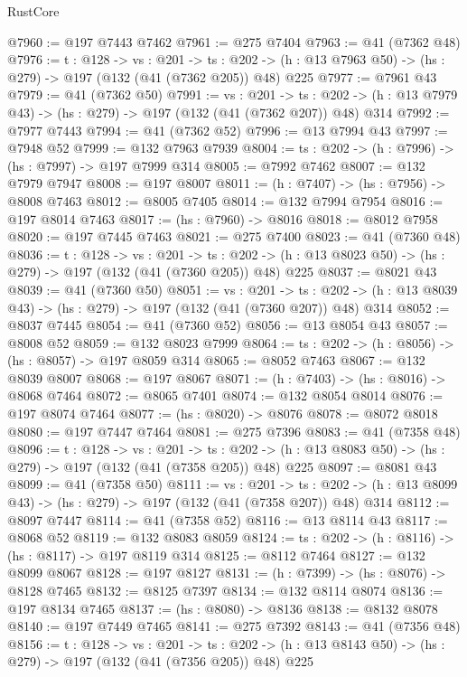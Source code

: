 \begin{lexlean}{RustCore}
\begin{coremodule}
@7960 := @197 @7443 @7462
@7961 := @275 @7404
@7963 := @41 (@7362 @48)
@7976 := {t : @128} ->
  {vs : @201} ->
  {ts : @202} -> (h : @13 @7963 @50) -> (hs : @279) -> @197 (@132 (@41 (@7362 @205)) @48) @225
@7977 := @7961 @43
@7979 := @41 (@7362 @50)
@7991 := {vs : @201} ->
  {ts : @202} -> (h : @13 @7979 @43) -> (hs : @279) -> @197 (@132 (@41 (@7362 @207)) @48) @314
@7992 := @7977 @7443
@7994 := @41 (@7362 @52)
@7996 := @13 @7994 @43
@7997 := @7948 @52
@7999 := @132 @7963 @7939
@8004 := {ts : @202} -> (h : @7996) -> (hs : @7997) -> @197 @7999 @314
@8005 := @7992 @7462
@8007 := @132 @7979 @7947
@8008 := @197 @8007
@8011 := (h : @7407) -> (hs : @7956) -> @8008 @7463
@8012 := @8005 @7405
@8014 := @132 @7994 @7954
@8016 := @197 @8014 @7463
@8017 := (hs : @7960) -> @8016
@8018 := @8012 @7958
@8020 := @197 @7445 @7463
@8021 := @275 @7400
@8023 := @41 (@7360 @48)
@8036 := {t : @128} ->
  {vs : @201} ->
  {ts : @202} -> (h : @13 @8023 @50) -> (hs : @279) -> @197 (@132 (@41 (@7360 @205)) @48) @225
@8037 := @8021 @43
@8039 := @41 (@7360 @50)
@8051 := {vs : @201} ->
  {ts : @202} -> (h : @13 @8039 @43) -> (hs : @279) -> @197 (@132 (@41 (@7360 @207)) @48) @314
@8052 := @8037 @7445
@8054 := @41 (@7360 @52)
@8056 := @13 @8054 @43
@8057 := @8008 @52
@8059 := @132 @8023 @7999
@8064 := {ts : @202} -> (h : @8056) -> (hs : @8057) -> @197 @8059 @314
@8065 := @8052 @7463
@8067 := @132 @8039 @8007
@8068 := @197 @8067
@8071 := (h : @7403) -> (hs : @8016) -> @8068 @7464
@8072 := @8065 @7401
@8074 := @132 @8054 @8014
@8076 := @197 @8074 @7464
@8077 := (hs : @8020) -> @8076
@8078 := @8072 @8018
@8080 := @197 @7447 @7464
@8081 := @275 @7396
@8083 := @41 (@7358 @48)
@8096 := {t : @128} ->
  {vs : @201} ->
  {ts : @202} -> (h : @13 @8083 @50) -> (hs : @279) -> @197 (@132 (@41 (@7358 @205)) @48) @225
@8097 := @8081 @43
@8099 := @41 (@7358 @50)
@8111 := {vs : @201} ->
  {ts : @202} -> (h : @13 @8099 @43) -> (hs : @279) -> @197 (@132 (@41 (@7358 @207)) @48) @314
@8112 := @8097 @7447
@8114 := @41 (@7358 @52)
@8116 := @13 @8114 @43
@8117 := @8068 @52
@8119 := @132 @8083 @8059
@8124 := {ts : @202} -> (h : @8116) -> (hs : @8117) -> @197 @8119 @314
@8125 := @8112 @7464
@8127 := @132 @8099 @8067
@8128 := @197 @8127
@8131 := (h : @7399) -> (hs : @8076) -> @8128 @7465
@8132 := @8125 @7397
@8134 := @132 @8114 @8074
@8136 := @197 @8134 @7465
@8137 := (hs : @8080) -> @8136
@8138 := @8132 @8078
@8140 := @197 @7449 @7465
@8141 := @275 @7392
@8143 := @41 (@7356 @48)
@8156 := {t : @128} ->
  {vs : @201} ->
  {ts : @202} -> (h : @13 @8143 @50) -> (hs : @279) -> @197 (@132 (@41 (@7356 @205)) @48) @225

\end{coremodule}
\end{lexlean}
